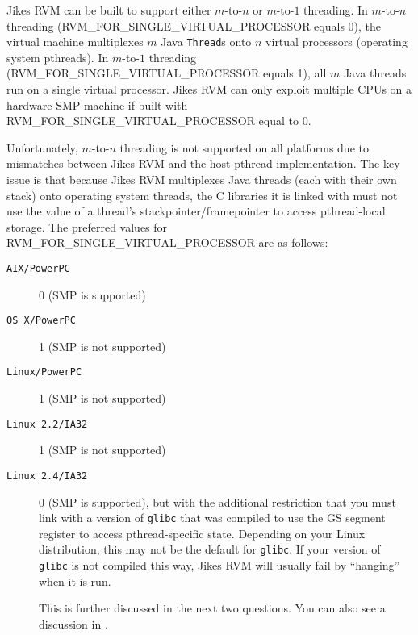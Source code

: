 Jikes RVM can be built to support either $m$-to-$n$ or $m$-to-$1$
threading.  In $m$-to-$n$ threading
(RVM\_FOR\_SINGLE\_VIRTUAL\_PROCESSOR equals 0), the virtual machine
multiplexes $m$ Java {\tt Thread}s
onto $n$ virtual processors (operating system pthreads).
In $m$-to-$1$ threading (RVM\_FOR\_SINGLE\_VIRTUAL\_PROCESSOR equals 1),
all $m$ Java threads run on a single virtual processor.  Jikes RVM 
can only exploit multiple CPUs on a hardware SMP machine if 
built with RVM\_FOR\_SINGLE\_VIRTUAL\_PROCESSOR equal to 0.

Unfortunately, $m$-to-$n$ threading is not supported on all platforms due to
mismatches between Jikes RVM  and the host pthread implementation.  
The key issue is that because Jikes RVM multiplexes Java threads
(each with their own stack) onto operating system threads, the
C libraries it is linked with must not use the value of a thread's
stackpointer/framepointer to access pthread-local storage.  The
preferred values for RVM\_FOR\_SINGLE\_VIRTUAL\_PROCESSOR are as
follows: 

\begin{description}

\item[{\tt AIX/PowerPC}] 0 (SMP is supported)

\item[{\tt OS~X/PowerPC}]  1 (SMP is not supported)

\item[{\tt Linux/PowerPC}]  1 (SMP is not supported)

\item[{\tt Linux 2.2/IA32}] 1 (SMP is not supported)

\item[{\tt Linux 2.4/IA32}] 0 (SMP is supported), but with the
additional restriction that you must link with a version of \texttt{glibc} that
was compiled to use the GS segment register to access pthread-specific
state.  Depending on your Linux\Rweb{} distribution, this may not be the
default for \texttt{glibc}.  If your version of \texttt{glibc}
is not compiled this way, Jikes RVM will usually fail by ``hanging'' when
it is run.

This is further discussed in the next two
questions.  You can also see a discussion in . 

\end{description}                

